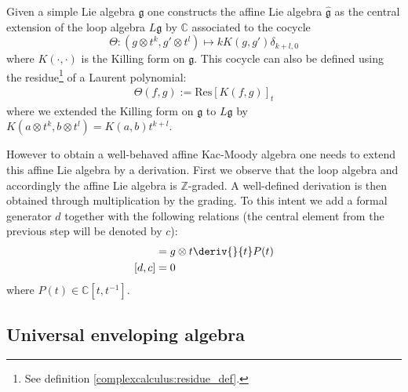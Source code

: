     \begin{construct}
        Given a simple Lie algebra $\mathfrak{g}$ one constructs the affine Lie algebra $\hat{\mathfrak{g}}$ as the central extension of the loop algebra $L\mathfrak{g}$ by $\mathbb{C}$ associated to the cocycle \[\Theta:(g\otimes t^k, g'\otimes t^l)\mapsto kK(g, g')\delta_{k+l, 0}\] where $K(\cdot, \cdot)$ is the Killing form on $\mathfrak{g}$. This cocycle can also be defined using the residue\footnote{See definition \ref{complexcalculus:residue_def}.} of a Laurent polynomial:
        \begin{gather}
            \Theta(f, g) := \text{Res}\left[K(f, g)\right]_t
        \end{gather}
        where we extended the Killing form on $\mathfrak{g}$ to $L\mathfrak{g}$ by $K(a\otimes t^k, b\otimes t^l)=K(a, b)t^{k+l}$.

        However to obtain a well-behaved affine Kac-Moody algebra one needs to extend this affine Lie algebra by a derivation. First we observe that the loop algebra and accordingly the affine Lie algebra is $\mathbb{Z}$-graded. A well-defined derivation is then obtained through multiplication by the grading. To this intent we add a formal generator $d$ together with the following relations (the central element from the previous step will be denoted by $c$):
        \begin{align}
            [d, g\otimes P(t)] &= g\otimes t\deriv{}{t}P(t)\\
            [d, c] &= 0
        \end{align}
        where $P(t)\in\mathbb{C}[t, t^{-1}]$.
    \end{construct}

\subsection{Universal enveloping algebra}

